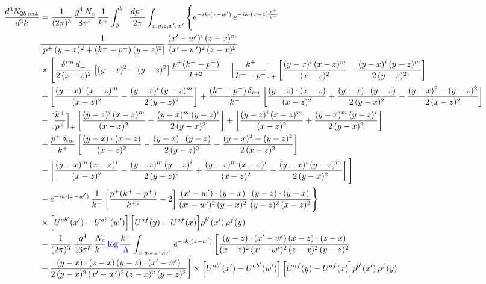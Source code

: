 \documentclass[9pt]{article}
\numberwithin{equation}{section}
\begin{document}
\begin{align}
\frac{d^{3}N_{2b\,\rm rest}}{d^{3}k} & =\frac{1}{(2\pi)^{3}}\,\frac{g^{4}\,N_{c}}{8\pi^{4}}\,\frac{1}{k^{+}}\int_{0}^{k^{+}}\frac{dp^{+}}{2\pi}\int_{x,y,z,x',w'}\Bigg\{e^{-ik\cdot(z-w')}\,e^{-ik\cdot(x-z)\frac{p^{+}}{k^{+}}}\,\notag \\ & \frac{1}{\left[p^{+}\,(y-x)^{2}+(k^{+}-p^{+})\,(y-z)^{2}\right]}\,\frac{(x'-w')^{i}\,(z-x)^{m}}{(x'-w')^{2}\,(z-x)^{2}}\notag\\
&\times\Bigg[\frac{\delta^{im}\,d_{\perp}}{2\,(x-z)^{2}}\left[(y-x)^{2}-(y-z)^{2}\right]\frac{p^{+}(k^{+}-p^{+})}{k^{+2}}
-\Big[\frac{k^{+}}{k^{+}-p^{+}}\Big]_{+}\left[\frac{(y-x)^{i}\,(x-z)^{m}}{(x-z)^{2}}-\frac{(y-x)^{i}\,(y-z)^{m}}{2\,(y-z)^{2}}\right]\notag\\
&+\left[\frac{(y-x)^{i}\,(x-z)^{m}}{(x-z)^{2}}-\frac{(y-x)^{i}\,(y-z)^{m}}{2\,(y-z)^{2}}\right]
+\frac{(k^{+}-p^{+})\,\delta_{im}}{k^{+}}\left[\frac{(y-z)\cdot(x-z)}{(x-z)^{2}}+\frac{(y-x)\cdot(y-z)}{2\,(y-x)^{2}}-\frac{(y-x)^{2}-(y-z)^{2}}{2\,(x-z)^{2}}\right]\notag\\
&-\Big[\frac{k^{+}}{p^{+}}\Big]_{+}\left[\frac{(y-z)^{i}\,(x-z)^{m}}{(x-z)^{2}}+\frac{(y-x)^{m}\,(y-z)^{i}}{2\,(y-x)^{2}}\right]+\left[\frac{(y-z)^{i}\,(x-z)^{m}}{(x-z)^{2}}+\frac{(y-x)^{m}\,(y-z)^{i}}{2\,(y-x)^{2}}\right]\notag\\
&+\frac{p^{+}\,\delta_{im}}{k^{+}}\left[\frac{(y-x)\cdot(x-z)}{(x-z)^{2}}-\frac{(y-x)\cdot(y-z)}{2\,(y-z)^{2}}-\frac{(y-x)^{2}-(y-z)^{2}}{2\,(x-z)^{2}}\right]\notag\\
&-\left[\frac{(y-x)^{m}\,(x-z)^{i}}{(x-z)^{2}}-\frac{(y-x)^{m}\,(y-z)^{i}}{2\,(y-z)^{2}}+\frac{(y-z)^{m}\,(x-z)^{i}}{(x-z)^{2}}+\frac{(y-x)^{i}\,(y-z)^{m}}{2\,(y-x)^{2}}\right]\Bigg]\notag\\
&-e^{-ik\cdot(x-w')}\,\frac{1}{k^{+}}\left[\frac{p^{+}(k^{+}-p^{+})}{k^{+2}}-2\right]\frac{(x'-w')\cdot(y-x)}{(x'-w')^{2}\,(y-x)^{2}}\,\frac{(y-z)\cdot(y-x)}{(y-z)^{2}\,(x-z)^{2}}\Bigg\}\notag\\
&\times\Big[U^{ab'}(x')-U^{ab'}(w')\Big]\,\Big[U^{af}(y)-U^{af}(x)\Big]\rho^{b'}(x')\,\rho^{f}(y)\notag \\ & -\frac{1}{(2\pi)^{3}}\,\frac{g^{4}}{16\pi^{5}}\,\frac{N_{c}}{k^{+}}\,{\color{blue}\log\frac{k^{+}}{\Lambda}}\int_{x,y,z,x',w'}\,e^{-ik\cdot(z-w')}\, \bigg[\frac{(y-z)\cdot (x'-w')\,(x-z)\cdot (z-x)}{(x-z)^{2}\,(x'-w')^{2}\,(z-x)^{2}\,(y-z)^{2}}\notag \\ & +\frac{(y-x)\cdot (z-x)\,(y-z)\cdot (x'-w')}{2\,(y-x)^{2}\,(x'-w')^{2}\,(z-x)^{2}\,(y-z)^{2}}\bigg]\times\Big[U^{ab'}(x')-U^{ab'}(w')\Big]\,\Big[U^{af}(y)-U^{af}(x)\Big]\rho^{b'}(x')\,\rho^{f}(y)\notag\\

\end{align}
\end{document}
